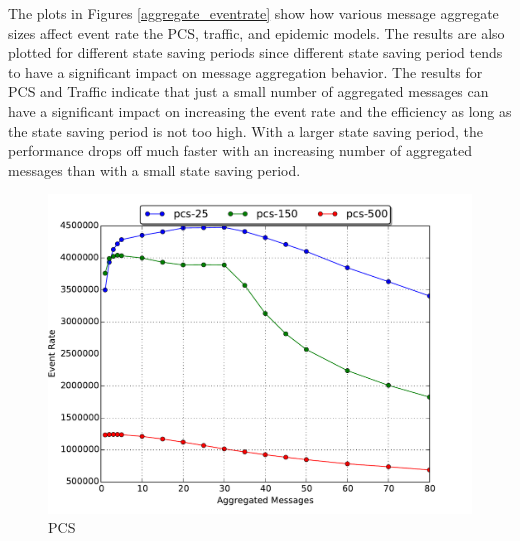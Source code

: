 \documentclass[11pt]{book}
\begin{document}
The plots in Figures \ref{aggregate_eventrate} show how various message aggregate sizes affect event
rate the PCS, traffic, and epidemic models.  The results are also plotted for different state saving
periods since different state saving period tends to have a significant impact on message
aggregation behavior.  The results for PCS and Traffic indicate that just a small number of
aggregated messages can have a significant impact on increasing the event rate and the efficiency as
long as the state saving period is not too high.  With a larger state saving period, the performance
drops off much faster with an increasing number of aggregated messages than with a small state
saving period.

\begin{figure}
  \begin{minipage}{.5\textwidth}
    \begin{center}
      \includegraphics[width=\textwidth,keepaspectratio,quiet]{figs/partitioning_communication/aggregate_pcs_eventrate.pdf} \\
      PCS \\
    \end{center}
  \end{minipage}%
  \hfill
  \begin{minipage}{.5\textwidth}
    \begin{center}

\end{center}
\end{minipage}
\end{figure}
\end{document}
